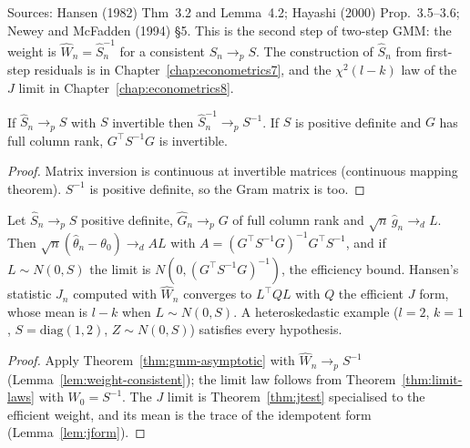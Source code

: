 Sources: Hansen (1982) Thm~3.2 and Lemma~4.2; Hayashi (2000) Prop.~3.5--3.6; Newey and McFadden (1994) \S5. This is
the second step of two-step GMM: the weight is $\hat W_n = \hat S_n^{-1}$ for a consistent $\hat S_n\to_p S$. The
construction of $\hat S_n$ from first-step residuals is in Chapter~\ref{chap:econometrics7}, and the $\chi^2(l-k)$ law of
the $J$ limit in Chapter~\ref{chap:econometrics8}.

\begin{lemma}
\label{lem:weight-consistent}
\leanok
{}
If $\hat S_n\to_p S$ with $S$ invertible then $\hat S_n^{-1}\to_p S^{-1}$. If $S$ is positive definite and $G$ has
full column rank, $G^\top S^{-1}G$ is invertible.
\end{lemma}
\begin{proof}
\leanok
Matrix inversion is continuous at invertible matrices (continuous mapping theorem). $S^{-1}$ is positive definite, so
the Gram matrix is too.
\end{proof}

\begin{theorem}
\label{thm:two-step-gmm}
\leanok
{}
Let $\hat S_n\to_p S$ positive definite, $\hat G_n\to_p G$ of full column rank and $\sqrt n\,\hat g_n\to_d L$. Then
$\sqrt n(\hat\theta_n-\theta_0)\to_d AL$ with $A = (G^\top S^{-1}G)^{-1}G^\top S^{-1}$, and if $L\sim N(0,S)$ the
limit is $N(0,(G^\top S^{-1}G)^{-1})$, the efficiency bound. Hansen's statistic $J_n$ computed with $\hat W_n$ converges
to $L^\top QL$ with $Q$ the efficient $J$ form, whose mean is $l-k$ when $L\sim N(0,S)$. A heteroskedastic example
($l=2$, $k=1$, $S = \mathrm{diag}(1,2)$, $Z\sim N(0,S)$) satisfies every hypothesis.
\end{theorem}
\begin{proof}
\leanok
Apply Theorem~\ref{thm:gmm-asymptotic} with $\hat W_n\to_p S^{-1}$ (Lemma~\ref{lem:weight-consistent}); the limit law
follows from Theorem~\ref{thm:limit-laws} with $W_0 = S^{-1}$. The $J$ limit is Theorem~\ref{thm:jtest} specialised to
the efficient weight, and its mean is the trace of the idempotent form (Lemma~\ref{lem:jform}).
\end{proof}
